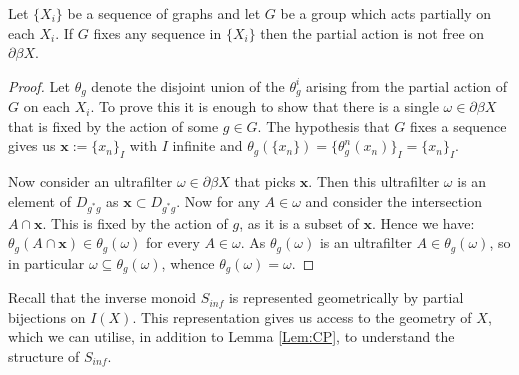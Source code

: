 \begin{lemma}\label{Lem:CP}
Let $\lbrace X_{i} \rbrace$ be a sequence of graphs and let $G$ be a group which acts partially on each $X_{i}$. If $G$ fixes any sequence in $\lbrace X_{i} \rbrace$ then the partial action is not free on $\partial \beta X$. 
\end{lemma}
\begin{proof}Let $\theta_{g}$ denote the disjoint union of the $\theta_{g}^{i}$ arising from the partial action of $G$ on each $X_{i}$. To prove this it is enough to show that there is a single $\omega \in\partial\beta X$ that is fixed by the action of some $g \in G$. The hypothesis that $G$ fixes a sequence gives us $\textbf{x}:=\lbrace x_{n} \rbrace_{I}$ with $I$ infinite and $\theta_{g}(\lbrace x_{n} \rbrace) = \lbrace\theta_{g}^{n}(x_{n}) \rbrace_{I} =\lbrace x_{n} \rbrace_{I}$.

Now consider an ultrafilter $\omega \in \partial\beta X$ that picks $\textbf{x}$. Then this ultrafilter $\omega$ is an element of $D_{g^{*}g}$ as $\textbf{x} \subset D_{g^{*}g}$.  Now for any $A \in \omega$ and consider the intersection $A \cap \textbf{x}$. This is fixed by the action of $g$, as it is a subset of $\textbf{x}$. Hence we have: $\theta_{g}(A \cap \textbf{x}) \in \theta_{g}(\omega)$ for every $A \in \omega$. As $\theta_{g}(\omega)$ is an ultrafilter $A \in \theta_{g}(\omega)$, so in particular $\omega \subseteq \theta_{g}(\omega)$, whence $\theta_{g}(\omega)=\omega$. 
\end{proof}

Recall that the inverse monoid $S_{inf}$ is represented geometrically by partial bijections on $I(X)$. This representation gives us access to the geometry of $X$, which we can utilise, in addition to Lemma \ref{Lem:CP}, to understand the structure of $S_{inf}$. 

